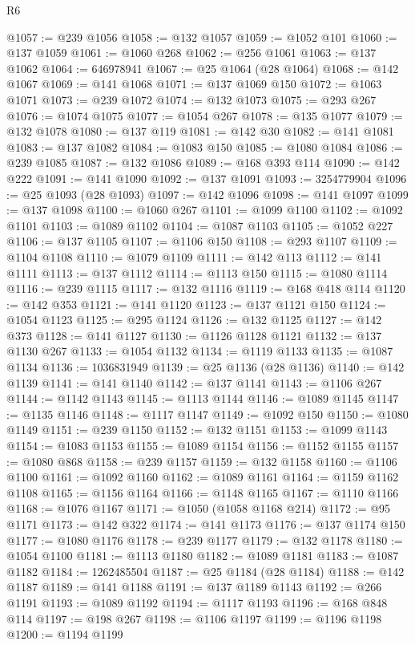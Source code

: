 \begin{lexlean}{R6}
\begin{coremodule}
@1057 := @239 @1056
@1058 := @132 @1057
@1059 := @1052 @101
@1060 := @137 @1059
@1061 := @1060 @268
@1062 := @256 @1061
@1063 := @137 @1062
@1064 := 646978941
@1067 := @25 @1064 (@28 @1064)
@1068 := @142 @1067
@1069 := @141 @1068
@1071 := @137 @1069 @150
@1072 := @1063 @1071
@1073 := @239 @1072
@1074 := @132 @1073
@1075 := @293 @267
@1076 := @1074 @1075
@1077 := @1054 @267
@1078 := @135 @1077
@1079 := @132 @1078
@1080 := @137 @119
@1081 := @142 @30
@1082 := @141 @1081
@1083 := @137 @1082
@1084 := @1083 @150
@1085 := @1080 @1084
@1086 := @239 @1085
@1087 := @132 @1086
@1089 := @168 @393 @114
@1090 := @142 @222
@1091 := @141 @1090
@1092 := @137 @1091
@1093 := 3254779904
@1096 := @25 @1093 (@28 @1093)
@1097 := @142 @1096
@1098 := @141 @1097
@1099 := @137 @1098
@1100 := @1060 @267
@1101 := @1099 @1100
@1102 := @1092 @1101
@1103 := @1089 @1102
@1104 := @1087 @1103
@1105 := @1052 @227
@1106 := @137 @1105
@1107 := @1106 @150
@1108 := @293 @1107
@1109 := @1104 @1108
@1110 := @1079 @1109
@1111 := @142 @113
@1112 := @141 @1111
@1113 := @137 @1112
@1114 := @1113 @150
@1115 := @1080 @1114
@1116 := @239 @1115
@1117 := @132 @1116
@1119 := @168 @418 @114
@1120 := @142 @353
@1121 := @141 @1120
@1123 := @137 @1121 @150
@1124 := @1054 @1123
@1125 := @295 @1124
@1126 := @132 @1125
@1127 := @142 @373
@1128 := @141 @1127
@1130 := @1126 @1128 @1121
@1132 := @137 @1130 @267
@1133 := @1054 @1132
@1134 := @1119 @1133
@1135 := @1087 @1134
@1136 := 1036831949
@1139 := @25 @1136 (@28 @1136)
@1140 := @142 @1139
@1141 := @141 @1140
@1142 := @137 @1141
@1143 := @1106 @267
@1144 := @1142 @1143
@1145 := @1113 @1144
@1146 := @1089 @1145
@1147 := @1135 @1146
@1148 := @1117 @1147
@1149 := @1092 @150
@1150 := @1080 @1149
@1151 := @239 @1150
@1152 := @132 @1151
@1153 := @1099 @1143
@1154 := @1083 @1153
@1155 := @1089 @1154
@1156 := @1152 @1155
@1157 := @1080 @868
@1158 := @239 @1157
@1159 := @132 @1158
@1160 := @1106 @1100
@1161 := @1092 @1160
@1162 := @1089 @1161
@1164 := @1159 @1162 @1108
@1165 := @1156 @1164
@1166 := @1148 @1165
@1167 := @1110 @1166
@1168 := @1076 @1167
@1171 := @1050 (@1058 @1168 @214)
@1172 := @95 @1171
@1173 := @142 @322
@1174 := @141 @1173
@1176 := @137 @1174 @150
@1177 := @1080 @1176
@1178 := @239 @1177
@1179 := @132 @1178
@1180 := @1054 @1100
@1181 := @1113 @1180
@1182 := @1089 @1181
@1183 := @1087 @1182
@1184 := 1262485504
@1187 := @25 @1184 (@28 @1184)
@1188 := @142 @1187
@1189 := @141 @1188
@1191 := @137 @1189 @1143
@1192 := @266 @1191
@1193 := @1089 @1192
@1194 := @1117 @1193
@1196 := @168 @848 @114
@1197 := @198 @267
@1198 := @1106 @1197
@1199 := @1196 @1198
@1200 := @1194 @1199

\end{coremodule}
\end{lexlean}
